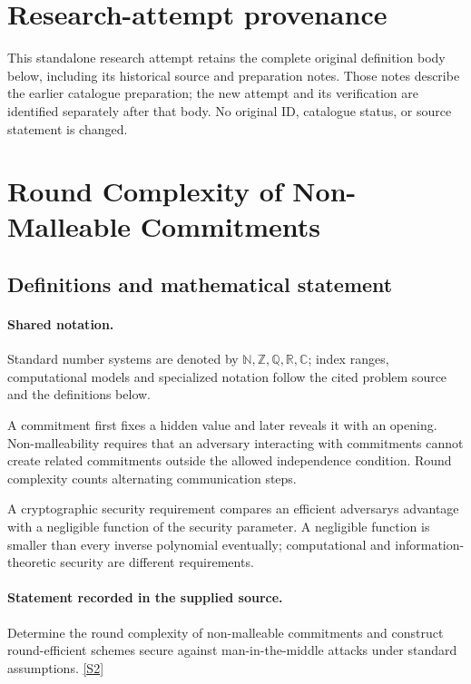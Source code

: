 \documentclass[11pt]{article}
\begin{document}
\section*{Research-attempt provenance}
This standalone research attempt retains the complete original definition body below,
including its historical source and preparation notes. Those notes describe the
earlier catalogue preparation; the new attempt and its verification are identified
separately after that body. No original ID, catalogue status, or source statement is changed.

\section{Round Complexity of Non-Malleable Commitments}\label{statement}

\subsection{Definitions and mathematical statement}

\paragraph{Shared notation.}Standard number systems are denoted by $\mathbb N,\mathbb Z,\mathbb Q,\mathbb R,\mathbb C$; index ranges, computational models and specialized notation follow the cited problem source and the definitions below.


A commitment first fixes a hidden value and later reveals it with an opening. Non-malleability requires that an adversary interacting with commitments cannot create related commitments outside the allowed independence condition. Round complexity counts alternating communication steps.

A cryptographic security requirement compares an efficient adversary\textquotesingle s advantage with a negligible function of the security parameter. A negligible function is smaller than every inverse polynomial eventually; computational and information-theoretic security are different requirements.
\paragraph{Statement recorded in the supplied source.}
Determine the round complexity of non-malleable commitments and construct round-efficient schemes secure against man-in-the-middle attacks under standard assumptions. \href{https://doi.org/10.4171/owr/2017/5}{[S2]}
\end{document}
